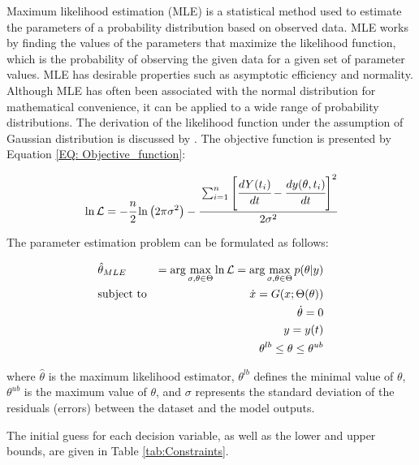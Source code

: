 \documentclass[a4paper,fleqn]{cas-dc}
\begin{document}
			Maximum likelihood estimation (MLE) is a statistical method used to estimate the parameters of a probability distribution based on observed data. MLE works by finding the values of the parameters that maximize the likelihood function, which is the probability of observing the given data for a given set of parameter values. MLE has desirable properties such as asymptotic efficiency and normality. Although MLE has often been associated with the normal distribution for mathematical convenience, it can be applied to a wide range of probability distributions. The derivation of the likelihood function under the assumption of  Gaussian distribution is discussed by \citet{Himmelblau1970}. The objective function is presented by Equation \ref{EQ: Objective_function}:
			
			{\footnotesize
				\begin{equation} \label{EQ: Objective_function}
					\ln \mathcal{L} = -\cfrac{n}{2}  \ln \left(2 \pi \sigma^2\right) 
					- \cfrac{ \sum_{i=1}^{n} \left[  \cfrac{d {Y}(t_i)}{dt} - \cfrac{dy(\theta, t_i)}{dt} \right]^2 }{2 \sigma^2}
				\end{equation}
			}
			
			The parameter estimation problem can be formulated as follows:
			
			{\footnotesize
				\begin{equation}
					\begin{aligned} \label{EQ: Optimization_formulation_MLE}
						&\hat{\theta}_{MLE} &= \arg \max_{\sigma, \theta \in \Theta} \ln \mathcal{L} = \arg \max_{\sigma,\theta \in \Theta} p(\theta|y) \\
						&\text{subject to}
						& \dot{ x } = G({\color{black} x};\Theta(\theta)) \\
						&& \dot{\theta} = 0 \\
						&& y = y(t) \\
						&& \theta^{lb} \leq \theta \leq \theta^{ub}
					\end{aligned}
			\end{equation} } 
			
			where $\hat{\theta}$ is the maximum likelihood estimator, $\theta^{lb}$ defines the minimal value of $\theta$, $\theta^{ub}$ is the maximum value of $\theta$, and $\sigma$ represents the standard deviation of the residuals (errors) between the dataset and the model outputs.
			
			The initial guess for each decision variable, as well as the lower and upper bounds, are given in Table \ref{tab:Constraints}. 
			
\end{document}
